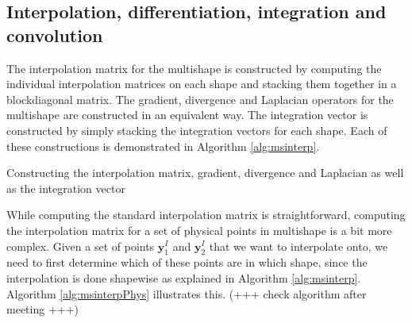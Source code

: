 \subsection{Interpolation, differentiation, integration and convolution}
The interpolation matrix for the multishape is constructed by computing the individual interpolation matrices on each shape and stacking them together in a blockdiagonal matrix. The gradient, divergence and Laplacian operators for the multishape are constructed in an equivalent way. The integration vector is constructed by simply stacking the integration vectors for each shape. Each of these constructions is demonstrated in Algorithm \ref{alg:msinterp}.

\begin{algorithm}[H]
	\SetAlgoLined
	\caption{Constructing the interpolation matrix, gradient, divergence and Laplacian as well as the integration vector}
	\label{alg:msinterp}
\end{algorithm}
While computing the standard interpolation matrix is straightforward, computing the interpolation matrix for a set of physical points in multishape is a bit more complex.
Given a set of points $\mathbf{y}_1^I$ and $\mathbf{y}_2^I$ that we want to interpolate onto, we need to first determine which of these points are in which shape, since the interpolation is done shapewise as explained in Algorithm \ref{alg:msinterp}. Algorithm \ref{alg:msinterpPhys} illustrates this. (+++ check algorithm after meeting +++)


